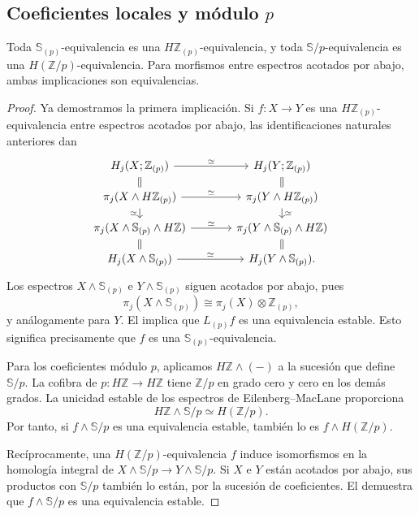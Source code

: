 \subsection{Coeficientes locales y módulo \texorpdfstring{$p$}{p}}
\begin{prop}\label{prop:c23-comparacion-equivalencias}
Toda $\mathbb S_{(p)}$-equivalencia es una $H\mathbb Z_{(p)}$-equivalencia, y toda $\mathbb S/p$-equivalencia es una $H(\mathbb Z/p)$-equivalencia. Para morfismos entre espectros acotados por abajo, ambas implicaciones son equivalencias.
\end{prop}

\begin{proof}
Ya demostramos la primera implicación. Si $f\colon X\to Y$ es una $H\mathbb Z_{(p)}$-equivalencia entre espectros acotados por abajo, las identificaciones naturales anteriores dan
\[
\begin{tikzcd}[column sep=large,row sep=small]
H_j(X;\mathbb Z_{(p)})\arrow[r,"\simeq"]\arrow[d,equal]&H_j(Y;\mathbb Z_{(p)})\arrow[d,equal]\\
\pi_j(X\wedge H\mathbb Z_{(p)})\arrow[r,"\simeq"]\arrow[d,"\simeq"']
&\pi_j(Y\wedge H\mathbb Z_{(p)})\arrow[d,"\simeq"]\\
\pi_j(X\wedge\mathbb S_{(p)}\wedge H\mathbb Z)\arrow[r,"\simeq"]\arrow[d,equal]
&\pi_j(Y\wedge\mathbb S_{(p)}\wedge H\mathbb Z)\arrow[d,equal]\\
H_j(X\wedge\mathbb S_{(p)})\arrow[r,"\simeq"]&H_j(Y\wedge\mathbb S_{(p)}).
\end{tikzcd}
\]
Los espectros $X\wedge\mathbb S_{(p)}$ e $Y\wedge\mathbb S_{(p)}$ siguen acotados por abajo, pues
\[
\pi_j(X\wedge\mathbb S_{(p)})\cong\pi_j(X)\otimes\mathbb Z_{(p)},
\]
y análogamente para $Y$. El  implica que $L_{(p)}f$ es una equivalencia estable. Esto significa precisamente que $f$ es una $\mathbb S_{(p)}$-equivalencia.

Para los coeficientes módulo $p$, aplicamos $H\mathbb Z\wedge(-)$ a la sucesión que define $\mathbb S/p$. La cofibra de $p\colon H\mathbb Z\to H\mathbb Z$ tiene $\mathbb Z/p$ en grado cero y cero en los demás grados. La unicidad estable de los espectros de Eilenberg--MacLane proporciona
\[
H\mathbb Z\wedge\mathbb S/p\simeq H(\mathbb Z/p).
\]
Por tanto, si $f\wedge\mathbb S/p$ es una equivalencia estable, también lo es $f\wedge H(\mathbb Z/p)$.

Recíprocamente, una $H(\mathbb Z/p)$-equivalencia $f$ induce isomorfismos en la homología integral de $X\wedge\mathbb S/p\to Y\wedge\mathbb S/p$. Si $X$ e $Y$ están acotados por abajo, sus productos con $\mathbb S/p$ también lo están, por la sucesión de coeficientes. El  demuestra que $f\wedge\mathbb S/p$ es una equivalencia estable.
\end{proof}

